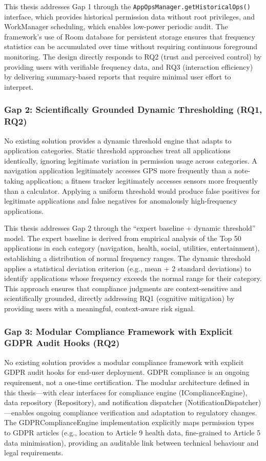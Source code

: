 This thesis addresses Gap 1 through the \texttt{AppOpsManager.getHistoricalOps()} interface, which provides historical permission data without root privileges, and WorkManager scheduling, which enables low-power periodic audit. The framework's use of Room database for persistent storage ensures that frequency statistics can be accumulated over time without requiring continuous foreground monitoring. The design directly responds to RQ2 (trust and perceived control) by providing users with verifiable frequency data, and RQ3 (interaction efficiency) by delivering summary-based reports that require minimal user effort to interpret.

\subsubsection{Gap 2: Scientifically Grounded Dynamic Thresholding (RQ1, RQ2)}
No existing solution provides a dynamic threshold engine that adapts to application categories. Static threshold approaches treat all applications identically, ignoring legitimate variation in permission usage across categories. A navigation application legitimately accesses GPS more frequently than a note-taking application; a fitness tracker legitimately accesses sensors more frequently than a calculator. Applying a uniform threshold would produce false positives for legitimate applications and false negatives for anomalously high-frequency applications.

This thesis addresses Gap 2 through the ``expert baseline + dynamic threshold'' model. The expert baseline is derived from empirical analysis of the Top 50 applications in each category (navigation, health, social, utilities, entertainment), establishing a distribution of normal frequency ranges. The dynamic threshold applies a statistical deviation criterion (e.g., mean + 2 standard deviations) to identify applications whose frequency exceeds the normal range for their category. This approach ensures that compliance judgments are context-sensitive and scientifically grounded, directly addressing RQ1 (cognitive mitigation) by providing users with a meaningful, context-aware risk signal.

\subsubsection{Gap 3: Modular Compliance Framework with Explicit GDPR Audit Hooks (RQ2)}
No existing solution provides a modular compliance framework with explicit GDPR audit hooks for end-user deployment. GDPR compliance is an ongoing requirement, not a one-time certification. The modular architecture defined in this thesis—with clear interfaces for compliance engine (IComplianceEngine), data repository (Repository), and notification dispatcher (NotificationDispatcher)—enables ongoing compliance verification and adaptation to regulatory changes. The GDPRComplianceEngine implementation explicitly maps permission types to GDPR articles (e.g., location to Article 9 health data, fine-grained to Article 5 data minimisation), providing an auditable link between technical behaviour and legal requirements.

